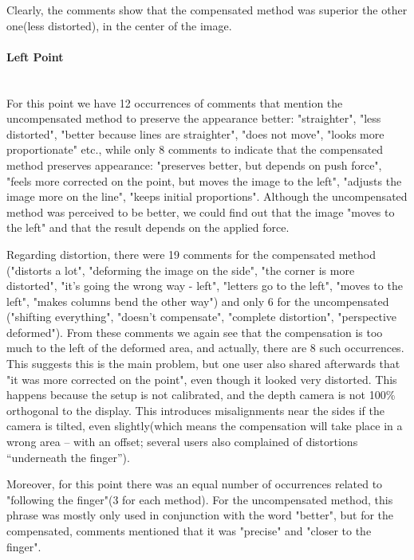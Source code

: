 \documentclass[]{article}
\begin{document}
Clearly, the comments show that the compensated method was superior the other one(less distorted), in the center of the image.

\paragraph{Left Point}\mbox{}\\

For this point we have 12 occurrences of comments that mention the uncompensated method to preserve the appearance better: "straighter", "less distorted", "better because lines are straighter", "does not move", "looks more proportionate" etc., while only 8 comments to indicate that the compensated method preserves appearance:
"preserves better, but depends on push force", "feels more corrected on the point, but moves the image to the left", "adjusts the image more on the line", "keeps initial proportions". Although the uncompensated method was perceived to be better, we could find out that the image "moves to the left" and that the result depends on the applied force.

Regarding distortion, there were 19 comments for the compensated method ("distorts a lot", "deforming the image on the side", "the corner is more distorted", "it's going the wrong way - left", "letters go to the left", "moves to the left", "makes columns bend the other way") and only 6 for the uncompensated ("shifting everything", "doesn't compensate", "complete distortion", "perspective deformed"). From these comments we again see that the compensation is too much to the left of the deformed area, and actually, there are 8 such occurrences. This suggests this is the main problem, but one user also shared afterwards that "it was more corrected on the point", even though it looked very distorted. This happens because the setup is not calibrated, and the depth camera is not 100\% orthogonal to the display. This introduces misalignments near the sides if the camera is tilted, even slightly(which means the compensation will take place in a wrong area – with an offset; several users also complained of distortions “underneath the finger”).

Moreover, for this point there was an equal number of occurrences related to "following the finger"(3 for each method). For the uncompensated method, this phrase was mostly only used in conjunction with the word "better", but for the compensated, comments mentioned that it was "precise" and "closer to the finger". 
\end{document}
